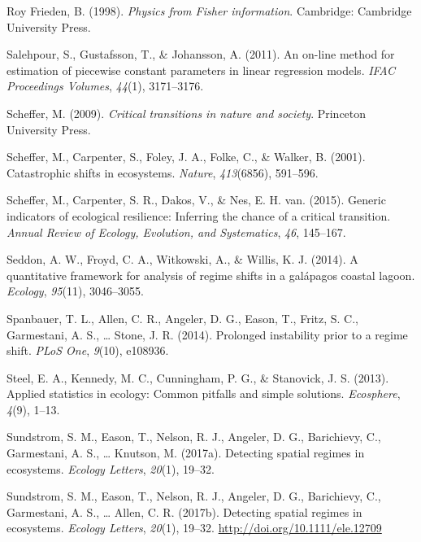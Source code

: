 \documentclass[12pt,twoside,openany]{reedthesis}
\begin{document}
\leavevmode\hypertarget{ref-roy_frieden_physics_1998}{}%
Roy Frieden, B. (1998). \emph{Physics from Fisher information}. Cambridge: Cambridge University Press.

\leavevmode\hypertarget{ref-salehpour2011line}{}%
Salehpour, S., Gustafsson, T., \& Johansson, A. (2011). An on-line method for estimation of piecewise constant parameters in linear regression models. \emph{IFAC Proceedings Volumes}, \emph{44}(1), 3171--3176.

\leavevmode\hypertarget{ref-scheffer_critical_2009}{}%
Scheffer, M. (2009). \emph{Critical transitions in nature and society}. Princeton University Press.

\leavevmode\hypertarget{ref-scheffer_catastrophic_2001}{}%
Scheffer, M., Carpenter, S., Foley, J. A., Folke, C., \& Walker, B. (2001). Catastrophic shifts in ecosystems. \emph{Nature}, \emph{413}(6856), 591--596.

\leavevmode\hypertarget{ref-scheffer2015generic}{}%
Scheffer, M., Carpenter, S. R., Dakos, V., \& Nes, E. H. van. (2015). Generic indicators of ecological resilience: Inferring the chance of a critical transition. \emph{Annual Review of Ecology, Evolution, and Systematics}, \emph{46}, 145--167.

\leavevmode\hypertarget{ref-seddon2014quantitative}{}%
Seddon, A. W., Froyd, C. A., Witkowski, A., \& Willis, K. J. (2014). A quantitative framework for analysis of regime shifts in a galápagos coastal lagoon. \emph{Ecology}, \emph{95}(11), 3046--3055.

\leavevmode\hypertarget{ref-spanbauer_prolonged_2014}{}%
Spanbauer, T. L., Allen, C. R., Angeler, D. G., Eason, T., Fritz, S. C., Garmestani, A. S., \ldots{} Stone, J. R. (2014). Prolonged instability prior to a regime shift. \emph{PLoS One}, \emph{9}(10), e108936.

\leavevmode\hypertarget{ref-steel2013applied}{}%
Steel, E. A., Kennedy, M. C., Cunningham, P. G., \& Stanovick, J. S. (2013). Applied statistics in ecology: Common pitfalls and simple solutions. \emph{Ecosphere}, \emph{4}(9), 1--13.

\leavevmode\hypertarget{ref-sundstrom_detecting_2017}{}%
Sundstrom, S. M., Eason, T., Nelson, R. J., Angeler, D. G., Barichievy, C., Garmestani, A. S., \ldots{} Knutson, M. (2017a). Detecting spatial regimes in ecosystems. \emph{Ecology Letters}, \emph{20}(1), 19--32.

\leavevmode\hypertarget{ref-sundstrom2017detecting}{}%
Sundstrom, S. M., Eason, T., Nelson, R. J., Angeler, D. G., Barichievy, C., Garmestani, A. S., \ldots{} Allen, C. R. (2017b). Detecting spatial regimes in ecosystems. \emph{Ecology Letters}, \emph{20}(1), 19--32. \url{http://doi.org/10.1111/ele.12709}
\end{document}
